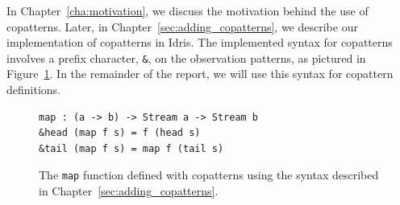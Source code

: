 In Chapter~\ref{cha:motivation}, we discuss the motivation behind the
use of copatterns. Later, in Chapter~\ref{sec:adding_copatterns}, we describe
our implementation of copatterns in Idris. The implemented
syntax for copatterns involves a prefix character, \texttt{\&}, on the
observation patterns, as pictured in
Figure~\ref{fig:map_copat_syntax}. In the remainder of the report, we will use this
syntax for copattern definitions.

\begin{figure}[h]
\begin{lstlisting}[mathescape]
map : (a -> b) -> Stream a -> Stream b
&head (map f s) = f (head s)
&tail (map f s) = map f (tail s)
\end{lstlisting}
\caption{The \texttt{map} function defined with copatterns using the syntax
  described in Chapter~\ref{sec:adding_copatterns}.}
\label{fig:map_copat_syntax}
\end{figure}

